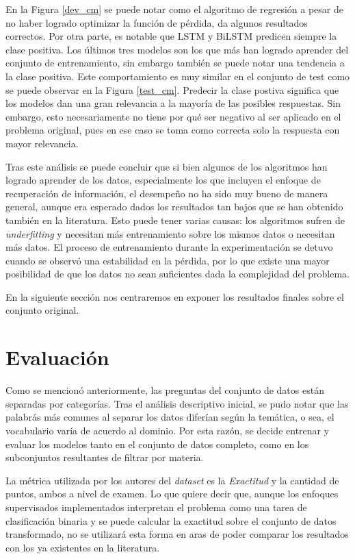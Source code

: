 En la Figura \ref{dev_cm} se puede notar como el algoritmo de regresión a pesar de no haber logrado optimizar la función de pérdida, da algunos resultados correctos. Por otra parte, es notable que LSTM y BiLSTM predicen siempre la clase positiva. Los últimos tres modelos son los que más han logrado aprender del conjunto de entrenamiento, sin embargo también se puede notar una tendencia a la clase positiva. Este comportamiento es muy similar en el conjunto de test como se puede observar en la Figura \ref{test_cm}. Predecir la clase postiva significa que los modelos dan una gran relevancia a la mayoría de las posibles respuestas. Sin embargo, esto necesariamente no tiene por qué ser negativo al ser aplicado en el problema original, pues en ese caso se toma como correcta solo la respuesta con mayor relevancia.

Tras este análisis se puede concluir que si bien algunos de los algoritmos han logrado aprender de los datos, especialmente los que incluyen el enfoque de recuperación de información, el desempeño no ha sido muy bueno de manera general, aunque era esperado dados los resultados tan bajos que se han obtenido también en la literatura. Esto puede tener varias causas: los algoritmos sufren de \textit{underfitting} y necesitan más entrenamiento sobre los mismos datos o necesitan más datos. El proceso de entrenamiento durante la experimentación se detuvo cuando se observó una estabilidad en la pérdida, por lo que existe una mayor posibilidad de que los datos no sean suficientes dada la complejidad del problema.

En la siguiente sección nos centraremos en exponer los resultados finales sobre el conjunto original.

\section{Evaluación}

Como se mencionó anteriormente, las preguntas del conjunto de datos están separadas por categorías. Tras el análisis descriptivo inicial, se pudo notar que las palabrás más comunes al separar los datos diferían según la temática, o sea, el vocabulario varía de acuerdo al dominio. Por esta razón, se decide entrenar y evaluar los modelos tanto en el conjunto de datos completo, como en los subconjuntos resultantes de filtrar por materia.

La métrica utilizada por los autores del \textit{dataset} es la \textit{Exactitud} y la cantidad de puntos, ambos a nivel de examen. Lo que quiere decir que, aunque los enfoques supervisados implementados interpretan el problema como una tarea de clasificación binaria y se puede calcular la exactitud sobre el conjunto de datos transformado, no se utilizará esta forma en aras de poder comparar los resultados con los ya existentes en la literatura. 


